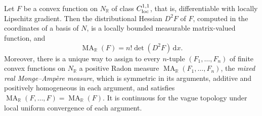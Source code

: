\begin{proposition}\label{prop:smooth-and-mixed-real-monge-ampere}
Let $F$ be a convex function on $N_{\mathbb R}$ of class $C^{1,1}_{\mathrm{loc}}$, that is, differentiable with locally Lipschitz gradient. Then the distributional Hessian $D^2F$ of $F$, computed in the coordinates of a basis of $N$, is a locally bounded measurable matrix-valued function, and
\[
 \operatorname{MA}_{\mathbb R}(F)
                    =n!\det(D^2F)\,\mathrm dx.
\]
Moreover, there is a unique way to assign to every $n$-tuple $(F_1,\ldots,F_n)$ of finite convex functions on $N_{\mathbb R}$ a positive Radon measure $\operatorname{MA}_{\mathbb R}(F_1,\ldots,F_n)$, the \emph{mixed real Monge--Amp\`ere measure}, which is symmetric in its arguments, additive and positively homogeneous in each argument, and satisfies $\operatorname{MA}_{\mathbb R}(F,\ldots,F)=\operatorname{MA}_{\mathbb R}(F)$. It is continuous for the vague topology under local uniform convergence of each argument.
\end{proposition}
